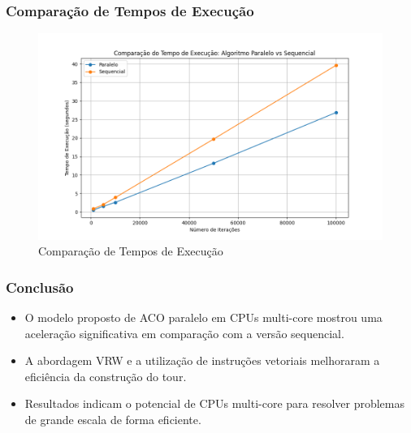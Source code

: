 \documentclass{beamer}
\begin{document}
	\begin{frame}
		\frametitle{Comparação de Tempos de Execução}
		\begin{figure}
			\centering
			\includegraphics[width=1\linewidth]{comparacao_tempo_execucao.png} %
			\caption{Comparação de Tempos de Execução}
		\end{figure}
	\end{frame}
	
	\begin{frame}
		\frametitle{Conclusão}
		\begin{itemize}
			\item O modelo proposto de ACO paralelo em CPUs multi-core mostrou uma aceleração significativa em comparação com a versão sequencial.
			\item A abordagem VRW e a utilização de instruções vetoriais melhoraram a eficiência da construção do tour.
			\item Resultados indicam o potencial de CPUs multi-core para resolver problemas de grande escala de forma eficiente.
		\end{itemize}
	\end{frame}
	
\end{document}
